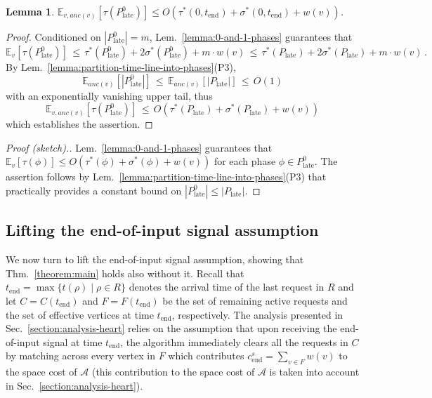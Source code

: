 \documentclass[11pt]{article}
\def\LongVersion{}
\def\LongVersionEnd{}
\def\ShortVersion{}
\def\ShortVersionEnd{}
\newtheorem{lemma}[theorem]{Lemma}
\theoremstyle{definition}
\theoremstyle{plain}
\newtheorem{lemma}[theorem]{Lemma}
\theoremstyle{definition}
\theoremstyle{plain}
\newtheorem{lemma}{Lemma}[section]
\theoremstyle{definition}
\theoremstyle{plain}
\newcommand{\Sect}{Sec.}
\newcommand{\Thm}{Thm.}
\newcommand{\Lem}{Lem.}
\newcommand{\aTime}{\mathit{t}}
\newcommand{\Expect}{\mathbb{E}}
\newcommand{\Ancestors}{\mathit{anc}}
\newcommand{\EndTime}{\mathit{t}_{\mathrm{end}}}
\newcommand{\sEndCost}{\mathit{c}_{\mathrm{end}}^{\mathit{s}}}
\newcommand{\Active}{\mathit{C}}
\newcommand{\Effective}{\mathit{F}}
\newcommand{\A}{\mathcal{A}}
\newcommand{\adv}[1]{{#1}^{*}}
\begin{document}
\begin{lemma} \label{lemma:bound-late-phases}
$\Expect_{v, \Ancestors(v)} \left[ \tau(P^{0}_{\mathrm{late}}) \right]
\leq
O \left( \adv{\tau}(0, \EndTime) + \adv{\sigma}(0, \EndTime) + w(v) \right)$.
\end{lemma}
%
\LongVersion %
\begin{proof}
Conditioned on $|P^{0}_{\mathrm{late}}| = m$,
\Lem{}~\ref{lemma:0-and-1-phases} guarantees that
\[
\Expect_{v} \left[ \tau(P^{0}_{\mathrm{late}}) \right]
\, \leq \,
\adv{\tau}(P^{0}_{\mathrm{late}}) + 2 \adv{\sigma}(P^{0}_{\mathrm{late}}) + m
\cdot w(v)
\, \leq \,
\adv{\tau}(P_{\mathrm{late}}) + 2 \adv{\sigma}(P_{\mathrm{late}}) + m \cdot
w(v) \, .
\]
By \Lem{}~\ref{lemma:partition-time-line-into-phases}(P3),
\[
\Expect_{\Ancestors(v)}[|P^{0}_{\mathrm{late}}|]
\, \leq \,
\Expect_{\Ancestors(v)}[|P_{\mathrm{late}}|]
\, \leq \,
O (1)
\]
with an exponentially vanishing upper tail, thus
\[
\Expect_{v, \Ancestors(v)} \left[ \tau(P^{0}_{\mathrm{late}}) \right]
\, \leq \,
O \left(
\adv{\tau}(P_{\mathrm{late}}) + \adv{\sigma}(P_{\mathrm{late}}) + w(v) \right)
\]
which establishes the assertion.
\end{proof}
\LongVersionEnd %
%
\ShortVersion %
\begin{proof}[Proof (sketch).]
\Lem{}~\ref{lemma:0-and-1-phases} guarantees that 
$\Expect_{v}[\tau(\phi)]
\leq
O (\adv{\tau}(\phi) + \adv{\sigma}(\phi) + w(v))$
for each phase $\phi \in P^{0}_{\mathrm{late}}$.
The assertion follows by
\Lem{}~\ref{lemma:partition-time-line-into-phases}(P3) that practically
provides a constant bound on
$|P^{0}_{\mathrm{late}}| \leq |P_{\mathrm{late}}|$.
\end{proof}
\ShortVersionEnd %

\LongVersion %
\subsection{Lifting the end-of-input signal assumption}
\label{section:lift-end-of-input-assumption}
We now turn to lift the end-of-input signal assumption, showing that
\Thm{}~\ref{theorem:main} holds also without it.
Recall that
$\EndTime = \max \{ \aTime(\rho) \mid \rho \in R \}$
denotes the arrival time of the last request in $R$ and let
$C = \Active(\EndTime)$
and
$F = \Effective(\EndTime)$
be the set of remaining active requests and the set of effective vertices at
time $\EndTime$, respectively.
The analysis presented in \Sect{}~\ref{section:analysis-heart} relies on the
assumption that upon receiving the end-of-input signal at time $\EndTime$, the
algorithm immediately clears all the requests in $C$ by matching across every
vertex in $F$ which contributes
$\sEndCost = \sum_{v \in F} w(v)$
to the space cost of $\A$ (this contribution to the space cost of $\A$ is
taken into account in \Sect{}~\ref{section:analysis-heart}).
\end{document}
